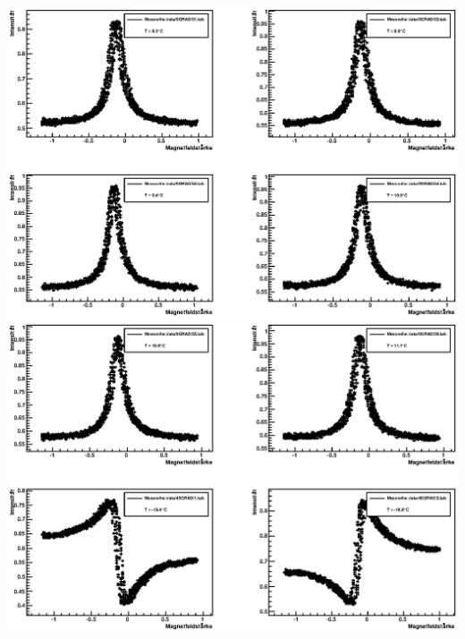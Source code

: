 \documentclass[12pt]{article}
\begin{document}
\includegraphics[width=1\linewidth]{pictures/18.eps} \\
\includegraphics[width=1\linewidth]{pictures/19.eps} \\
\end{document}

